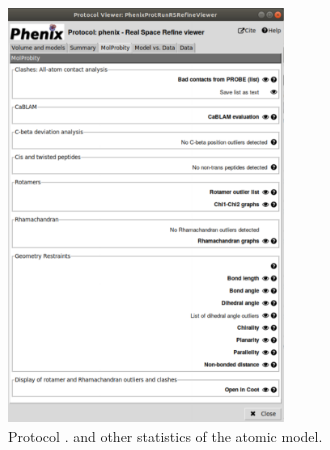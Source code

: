 \begin{itemize}
\begin{itemize}
        \begin{figure}[H]
         \centering 
         \captionsetup{width=.7\linewidth} 
         \includegraphics[width=0.65\textwidth]{Images_appendix/Fig150.pdf}
         \caption{Protocol . \molprobity and other statistics of the atomic model.}
         \label{fig:app_protocol_real_space_refine_3}
        \end{figure}
        

\end{itemize}
\end{itemize}
